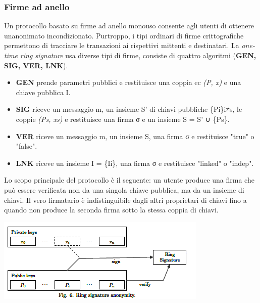 \documentclass[
]{article}
\providecommand{\tightlist}{%
  \setlength{\itemsep}{0pt}\setlength{\parskip}{0pt}}
\begin{document}
\subsubsection{Firme ad anello}\label{firme-ad-anello}

Un protocollo basato su firme ad anello monouso consente agli utenti di
ottenere un\textquotesingle anonimato incondizionato. Purtroppo, i tipi
ordinari di firme crittografiche permettono di tracciare le transazioni
ai rispettivi mittenti e destinatari. La \emph{one-time ring signature}
usa diverse tipi di firme, consiste di quattro algoritmi (\textbf{GEN,
SIG, VER, LNK}).

\begin{itemize}
\tightlist
\item
  \textbf{GEN} prende parametri pubblici e restituisce una coppia ec
  \emph{(P, x)} e una chiave pubblica I.
\item
  \textbf{SIG} riceve un messaggio m, un insieme S' di chiavi pubbliche
  \{Pi\}i≠s, le coppie \emph{(Ps, xs)} e restituisce una firma σ e un
  insieme S = S' ∪ \{Ps\}.
\item
  \textbf{VER} riceve un messaggio m, un insieme S, una firma σ e
  restituisce "true" o "false".
\item
  \textbf{LNK} riceve un insieme I = \{Ii\}, una firma σ e restituisce
  "linked" o "indep".
\end{itemize}

Lo scopo principale del protocollo è il seguente: un utente produce una
firma che può essere verificata non da una singola chiave pubblica, ma
da un insieme di chiavi. Il vero firmatario è indistinguibile dagli
altri proprietari di chiavi fino a quando non produce la seconda firma
sotto la stessa coppia di chiavi.

\includegraphics{media/image5.png}
\end{document}
